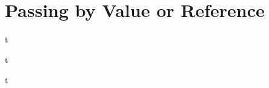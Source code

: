 \documentclass[../lecture4-functions.tex]{subfiles}
\begin{document}
\section{Passing by Value or Reference}


\begin{frame}[fragile]{}
t
\end{frame}


\begin{frame}[fragile]{}
t
\end{frame}


\begin{frame}[fragile]{}
t
\end{frame}

\end{document}
